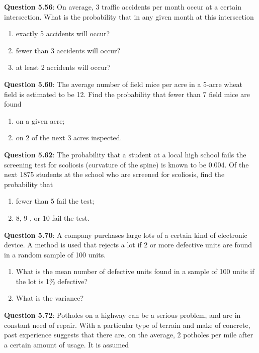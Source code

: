 \documentclass{article}
\begin{document}
    \textbf{Question 5.56}: On average, 3 traffic accidents per month occur
    at a certain intersection. What is the probability that
    in any given month at this intersection
        \begin{enumerate}[label = (\alph*)]
            \item exactly 5 accidents will occur?
            \item fewer than 3 accidents will occur?
            \item at least 2 accidents will occur?
        \end{enumerate}
    \textbf{Question 5.60}: The average number of field mice per acre in
    a 5-acre wheat field is estimated to be 12. Find the
    probability that fewer than 7 field mice are found
        \begin{enumerate}[label = (\alph*)]
            \item on a given acre;
            \item on 2 of the next 3 acres inspected.
        \end{enumerate}
    \textbf{Question 5.62}: The probability that a student at a local high
    school fails the screening test for scoliosis (curvature
    of the spine) is known to be 0.004. Of the next 1875
    students at the school who are screened for scoliosis, find the probability that
        \begin{enumerate}[label = (\alph*)]
            \item fewer than 5 fail the test;
            \item 8, 9 , or 10 fail the test.
        \end{enumerate}
    \textbf{Question 5.70}: A company purchases large lots of a certain kind
    of electronic device. A method is used that rejects a
    lot if 2 or more defective units are found in a random
    sample of 100 units.
        \begin{enumerate}[label = (\alph*)]
            \item What is the mean number of defective units found
            in a sample of 100 units if the lot is 1\% defective?
            \item What is the variance?
        \end{enumerate}
    \textbf{Question 5.72}:  Potholes on a highway can be a serious problem,
    and are in constant need of repair. With a particular
    type of terrain and make of concrete, past experience
    suggests that there are, on the average, 2 potholes per
    mile after a certain amount of usage. It is assumed
\end{document}
